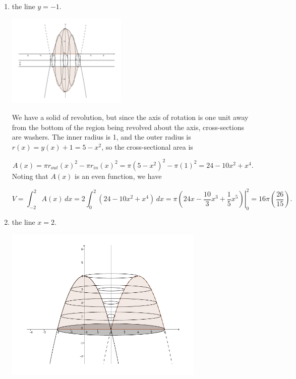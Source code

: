 \documentclass[12pt]{article}
\begin{document}
\begin{enumerate}
\begin{enumerate}
 \item the line $y=-1$.
 
 \medskip

\begin{multicols}{2}
 
  \includegraphics[width=0.45\textwidth]{WS4-2cii}


We have a solid of revolution, but since the axis of rotation is one unit away from the bottom of the region being revolved about the axis, cross-sections are washers. The inner radius is 1, and the outer radius is $r(x)=y(x)+1=5-x^2$, so the cross-sectional area is
\end{multicols}
\[
 A(x) = \pi r_{out}(x)^2-\pi r_{in}(x)^2 = \pi(5-x^2)^2-\pi(1)^2 = 24-10x^2+x^4.
\]
Noting that $A(x)$ is an even function, we have

\[
 V = \int_{-2}^2A(x)\,dx = 2\int_0^2(24-10x^2+x^4)\,dx = \pi\left.\left(24x-\frac{10}{3}x^3+\frac{1}{5}x^5\right)\right|_0^2 = 16\pi\left(\frac{26}{15}\right).
\]

 \item the line $x=2$.
 
 \medskip
 
  \includegraphics[width=0.75\textwidth]{WS4-2ciii}



\end{enumerate}
\end{enumerate}
\end{document}
